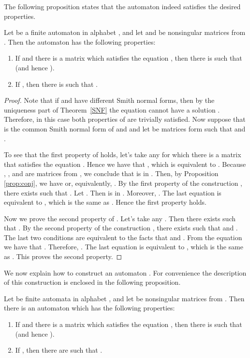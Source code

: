 \documentclass[fontsize=11pt,DIV=13,paper=letter]{scrartcl}
\theoremstyle{definition}
\begin{document}
The following proposition states that the automaton  indeed satisfies the desired properties.

\begin{proposition} \label{prop:aut1}
Let  be a finite automaton in alphabet , and let  and  be nonsingular matrices from . Then the automaton  has the following properties:
\begin{enumerate}[(1)]
\item If  and there is a matrix  which satisfies the equation , then there is  such that  (and hence ).

\item If , then there is  such that .
\end{enumerate}
\end{proposition}

\begin{proof}
Note that if  and  have different Smith normal forms, then by the uniqueness part of Theorem~\ref{SNF} the equation  cannot have a solution . Therefore, in this case both properties of  are trivially satisfied. Now suppose that  is the common Smith normal form of  and  and let  be matrices form  such that  and .

To see that the first property of  holds, let's take any  for which there is a matrix  that satisfies the equation . Hence we have that , which is equivalent to . Because , , and  are matrices from , we conclude that  is in . Then, by Proposition \ref{prop:conj}, we have  or, equivalently, . By the first property of the construction , there exists  such that . Let . Then  is in . Moreover, . The last equation is equivalent to , which is the same as . Hence the first property holds.

Now we prove the second property of . Let's take any . Then there exists  such that . By the second property of the construction , there exists  such that  and . The last two conditions are equivalent to the facts that  and . From the equation  we have that . Therefore, . The last equation is equivalent to , which is the same as . This proves the second property.

\end{proof}

We now explain how to construct an automaton . For convenience the description of this construction is enclosed in the following proposition.

\begin{proposition}\label{prop:autom}
Let  be finite automata in alphabet , and let  be nonsingular matrices from . Then there is an automaton  which has the following properties:
\begin{enumerate}[(1)]
\item If  and there is a matrix  which satisfies the equation , then there is  such that  (and hence ).

\item If , then there are  such that .
\end{enumerate}
\end{proposition}
\end{document}
